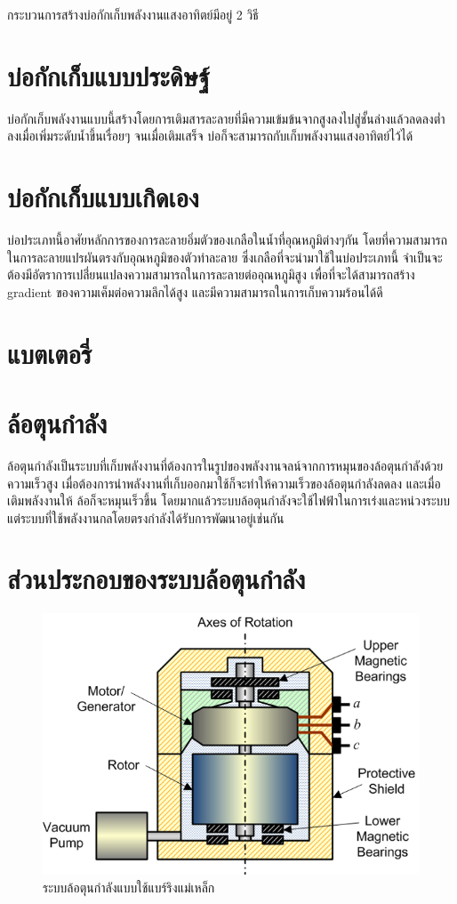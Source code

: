 \documentclass[a4paper,nobib,openany]{tufte-book}
\begin{document}
กระบวนการสร้างบ่อกักเก็บพลังงานแสงอาทิตย์มีอยู่ 2 วิธี

\section{บ่อกักเก็บแบบประดิษฐ์}
\label{sec:orgdbabf18}
บ่อกักเก็บพลังงานแบบนี้สร้างโดยการเติมสารละลายที่มีความเข้มข้นจากสูงลงไปสู่ชั้นล่างแล้วลดลงต่ำลงเมื่อเพิ่มระดับน้ำขึ้นเรื่อยๆ
จนเมื่อเติมเสร็จ บ่อก็จะสามารถกับเก็บพลังงานแสงอาทิตย์ไว้ได้

\section{บ่อกักเก็บแบบเกิดเอง}
\label{sec:org860dc65}
บ่อประเภทนี้อาศัยหลักการของการละลายอิ่มตัวของเกลือในน้ำที่อุณหภูมิต่างๆกัน
โดยที่ความสามารถในการละลายแปรผันตรงกับอุณหภูมิของตัวทำละลาย
ซึ่งเกลือที่จะนำมาใช้ในบ่อประเภทนี้
จำเป็นจะต้องมีอัตราการเปลี่่ยนแปลงความสามารถในการละลายต่ออุณหภูมิสูง
เพื่อที่จะได้สามารถสร้าง gradient ของความเค็มต่อความลึกได้สูง
และมีความสามารถในการเก็บความร้อนได้ดี

\section{แบตเตอรี่}
\label{sec:orgd318977}
\section{ล้อตุนกำลัง}
\label{sec:org6488b83}
ล้อตุนกำลังเป็นระบบที่เก็บพลังงานที่ต้องการในรูปของพลังงานจลน์จากการหมุนของล้อตุนกำลังด้วยความเร็วสูง
เมื่อต้องการนำพลังงานที่เก็บออกมาใช้ก็จะทำให้ความเร็วของล้อตุนกำลังลดลง
และเมื่อเติมพลังงานให้ ล้อก็จะหมุนเร็วขึ้น
โดยมากแล้วระบบล้อตุนกำลังจะใช้ไฟฟ้าในการเร่งและหน่วงระบบ
แต่ระบบที่ใช้พลังงานกลโดยตรงกำลังได้รับการพัฒนาอยู่เช่นกัน

\section{ส่วนประกอบของระบบล้อตุนกำลัง}
\label{sec:org6db0a51}
\begin{figure}[htbp]
\centering
\includegraphics[width=.9\linewidth]{./pictures/flywheel-components.png}
\caption{ระบบล้อตุนกำลังแบบใช้แบร์ริงแม่เหล็ก}
\end{figure}
\end{document}
